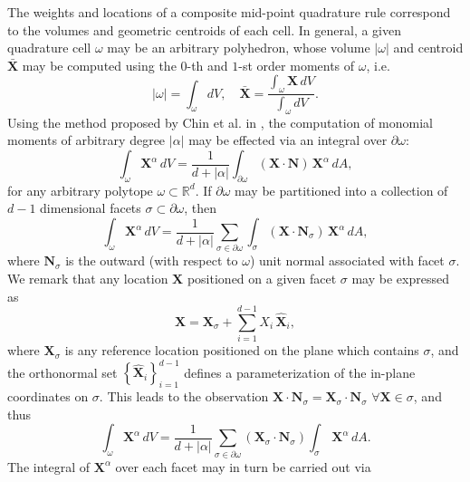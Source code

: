 	The weights and locations of a composite mid-point quadrature rule correspond to the volumes and geometric centroids of each cell. In general, a given quadrature cell $\omega$ may be an arbitrary polyhedron, whose volume $|\omega|$ and centroid $\bar{\mathbf{X}}$ may be computed using the $0$-th and $1$-st order moments of $\omega$, i.e.
	\begin{equation}
		|\omega| = \int_{\omega} dV, \quad \bar{\mathbf{X}} = \frac{\int_{\omega} \mathbf{X} \, dV}{\int_{\omega} dV}.
	\end{equation}
	Using the method proposed by Chin et al. in \cite{Chin:15}, the computation of monomial moments of arbitrary degree $|\alpha|$ may be effected via an integral over $\partial \omega$:
	\begin{equation}
		\int_{\omega} \mathbf{X}^\alpha \, dV = \frac{1}{d+|\alpha|} \int_{\partial \omega} (\mathbf{X} \cdot \mathbf{N}) \, \mathbf{X}^\alpha \, dA,
	\end{equation}
	for any arbitrary polytope $\omega \subset \mathbb{R}^d$. If $\partial \omega$ may be partitioned into a collection of $d-1$ dimensional facets $\sigma \subset \partial \omega$, then
	\begin{equation}
		\int_{\omega} \mathbf{X}^\alpha \, dV = \frac{1}{d+|\alpha|} \sum_{\sigma \in \partial \omega} \int_{\sigma} (\mathbf{X} \cdot \mathbf{N}_{\sigma}) \, \mathbf{X}^\alpha \, dA,
	\end{equation}
	where $\mathbf{N}_\sigma$ is the outward (with respect to $\omega$) unit normal associated with facet $\sigma$. We remark that any location $\mathbf{X}$ positioned on a given facet $\sigma$ may be expressed as
	\begin{equation}
		\mathbf{X} = \mathbf{X}_\sigma + \sum_{i=1}^{d-1} X_i \, \hat{\mathbf{X}}_i,
	\end{equation}
	where $\mathbf{X}_\sigma$ is any reference location positioned on the plane which contains $\sigma$, and the orthonormal set $\left\{ \hat{\mathbf{X}}_i \right\}_{i=1}^{d-1}$ defines a parameterization of the in-plane coordinates on $\sigma$. This leads to the observation $\mathbf{X} \cdot \mathbf{N}_\sigma = \mathbf{X}_\sigma \cdot \mathbf{N}_\sigma \, \, \forall \mathbf{X} \in \sigma$, and thus
	\begin{equation}
		\int_{\omega} \mathbf{X}^\alpha \, dV = \frac{1}{d+|\alpha|} \sum_{\sigma \in \partial \omega} (\mathbf{X}_\sigma \cdot \mathbf{N}_{\sigma}) \int_{\sigma} \, \mathbf{X}^\alpha \, dA.
	\end{equation}
	The integral of $\mathbf{X}^\alpha$ over each facet may in turn be carried out via
